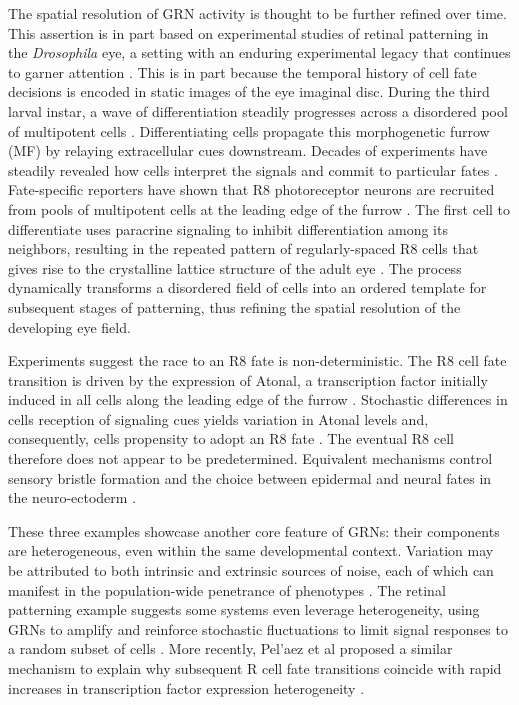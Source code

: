 The spatial resolution of GRN activity is thought to be further refined over time. This assertion is in part based on experimental studies of retinal patterning in the \textit{Drosophila} eye, a setting with an enduring experimental legacy that continues to garner attention \cite{Beira2016}. This is in part because the temporal history of cell fate decisions is encoded in static images of the eye imaginal disc. During the third larval instar, a wave of differentiation steadily progresses across a disordered pool of multipotent cells \cite{Ready1976a,Tomlinson1987a}. Differentiating cells propagate this morphogenetic furrow (MF) by relaying extracellular cues downstream. Decades of experiments have steadily revealed how cells interpret the signals and commit to particular fates \cite{Voas2004}. Fate-specific reporters have shown that R8 photoreceptor neurons are recruited from pools of multipotent cells at the leading edge of the furrow \cite{Jarman1994}. The first cell to differentiate uses paracrine signaling to inhibit differentiation among its neighbors, resulting in the repeated pattern of regularly-spaced R8 cells that gives rise to the crystalline lattice structure of the adult eye \cite{Frankfort2002a}. The process dynamically transforms a disordered field of cells into an ordered template for subsequent stages of patterning, thus refining the spatial resolution of the developing eye field.

Experiments suggest the race to an R8 fate is non-deterministic. The R8 cell fate transition is driven by the expression of Atonal, a transcription factor initially induced in all cells along the leading edge of the furrow \cite{Jarman1994,Baker1997,Hsiung2002}. Stochastic differences in cells reception of signaling cues yields variation in Atonal levels and, consequently, cells propensity to adopt an R8 fate \cite{Baker1990,Gavish2016}. The eventual R8 cell therefore does not appear to be predetermined. Equivalent mechanisms control sensory bristle formation and the choice between epidermal and neural fates in the neuro-ectoderm \cite{Ghysen1993,Simpson1997}.

These three examples showcase another core feature of GRNs: their components are heterogeneous, even within the same developmental context. Variation may be attributed to both intrinsic and extrinsic sources of noise, each of which can manifest in the population-wide penetrance of phenotypes \cite{Raj2010,Paulsen2011,Burga2011,Colman-Lerner2005}. The retinal patterning example suggests some systems even leverage heterogeneity, using GRNs to amplify and reinforce stochastic fluctuations to limit signal responses to a random subset of cells \cite{Baker1990,Ghysen1993,Simpson1997}. More recently, Pel'{a}ez et al proposed a similar mechanism to explain why subsequent R cell fate transitions coincide with rapid increases in transcription factor expression heterogeneity \cite{Pelaez2015a}.

